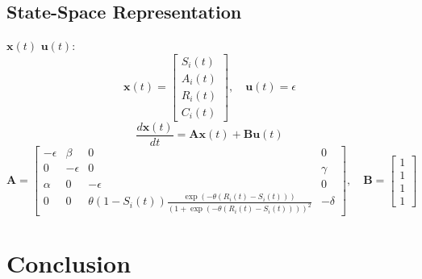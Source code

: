 \documentclass[english, a4paper, 11pt]{article}
\begin{document}
\subsection*{State-Space Representation}
 $\mathbf{x}(t)$  $\mathbf{u}(t)$:
\begin{equation}
\mathbf{x}(t) = \begin{bmatrix} S_i(t) \\ A_i(t) \\ R_i(t) \\ C_i(t) \end{bmatrix}, \quad \mathbf{u}(t) = \epsilon
\end{equation}
\begin{equation}
\frac{d\mathbf{x}(t)}{dt} = \mathbf{A} \mathbf{x}(t) + \mathbf{B} \mathbf{u}(t)
\end{equation}
\begin{equation}
\mathbf{A} = \begin{bmatrix}
-\epsilon & \beta & 0 & 0 \\
0 & -\epsilon & 0 & \gamma \\
\alpha & 0 & -\epsilon & 0 \\
0 & 0 & \theta (1 - S_i(t)) \frac{\exp(-\theta (R_i(t) - S_i(t)))}{(1 + \exp(-\theta (R_i(t) - S_i(t))))^2} & -\delta
\end{bmatrix}, \quad \mathbf{B} = \begin{bmatrix} 1 \\ 1 \\ 1 \\ 1 \end{bmatrix}
\end{equation}


\section{Conclusion}


\printbibliography
\end{document}
